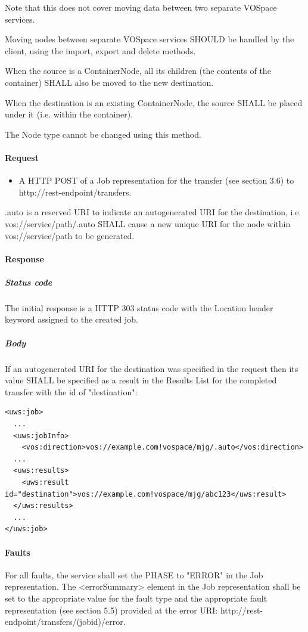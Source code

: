 \documentclass[11pt,a4paper]{ivoa}
\begin{document}
Note that this does not cover moving data between two separate VOSpace services.

Moving nodes between separate VOSpace services SHOULD be handled by the client, using the import, export and delete methods.

When the source is a ContainerNode, all its children (the contents of the container) SHALL also be moved to the new destination.

When the destination is an existing ContainerNode, the source SHALL be placed under it (i.e. within the container).

The Node type cannot be changed using this method.

\paragraph{Request}
\begin{itemize}
    \item A HTTP POST of a Job representation for the transfer (see section 3.6) to http://rest-endpoint/transfers.
\end{itemize}

.auto is a reserved URI to indicate an autogenerated URI for the destination, i.e. vos://service/path/.auto SHALL cause a new unique URI for the node within vos://service/path to be generated.

\paragraph{Response}
\subparagraph{Status code} The initial response is a HTTP 303 status code with the Location header keyword assigned to the created job.
\subparagraph{Body}
If an autogenerated URI for the destination was specified in the request then its value SHALL be specified as a result in the Results List for the completed transfer with the id of "destination":
\begin{lstlisting}
<uws:job>
  ...
  <uws:jobInfo>
    <vos:direction>vos://example.com!vospace/mjg/.auto</vos:direction>
  ...
  <uws:results>
    <uws:result id="destination">vos://example.com!vospace/mjg/abc123</uws:result>
  </uws:results>
  ...
</uws:job>
\end{lstlisting}

\paragraph{Faults}

For all faults, the service shall set the PHASE to "ERROR" in the Job representation. The <errorSummary> element in the Job representation shall be set to the appropriate value for the fault type and the appropriate fault representation (see section 5.5) provided at the error URI: http://rest-endpoint/transfers/(jobid)/error.
\end{document}
